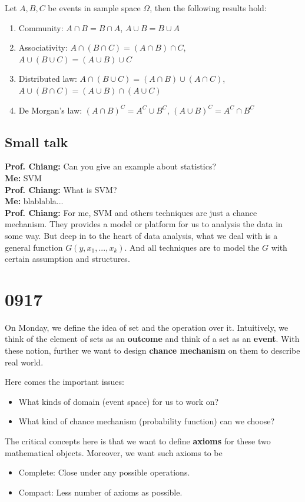\documentclass[11pt]{report}
\begin{document}
\begin{property}
	Let $A,B,C$ be events in sample space $\Omega$, then the following results hold:
	\begin{enumerate}
		\item Community: $A\cap B=B\cap  A$, $A\cup B=B\cup A$
		\item Associativity: $A\cap(B\cap C) = (A\cap B)\cap C$, $A\cup(B\cup C)=(A\cup B)\cup C$
		\item Distributed law: $A\cap(B\cup C) = (A\cap B)\cup(A\cap C)$, $A\cup(B\cap C)=(A\cup B)\cap(A\cup C)$
		\item De Morgan's law: $(A\cap B)^C = A^C\cup B^C$, $(A\cup B)^C = A^C\cap B^C$
	\end{enumerate}
\end{property}

\section{Small talk}
{\bf Prof. Chiang:} Can you give an example about statistics?\\
{\bf Me:} SVM\\
{\bf Prof. Chiang:} What is SVM?\\
{\bf Me:} blablabla...\\
{\bf Prof. Chiang:} For me, SVM and others techniques are just a chance mechanism. They provides a model or platform for us to analysis the data in some way. But deep in to the heart of data analysis, what we deal with is a general function $G(y,x_1,...,x_k)$. And all techniques are to model the $G$ with certain assumption and structures.

\chapter{0917}
On Monday, we define the idea of set and the operation over it. Intuitively, we think of the element of sets as an {\bf outcome} and think of a set as an {\bf event}. With these notion, further we want to design {\bf chance mechanism} on them to describe real world.

Here comes the important issues:
\begin{itemize}
	\item What kinds of domain (event space) for us to work on?
	\item What kind of chance mechanism (probability function) can we choose?
\end{itemize}
The critical concepts here is that we want to define {\bf axioms} for these two mathematical objects. Moreover, we want such axioms to be
\begin{itemize}
	\item Complete: Close under any possible operations.
	\item Compact: Less number of axioms as possible.
\end{itemize}
\end{document}
